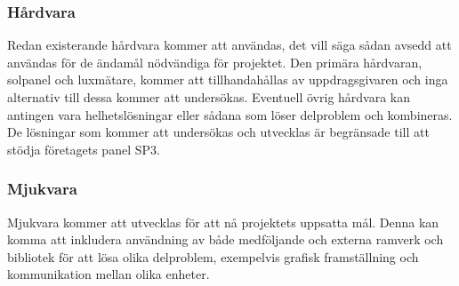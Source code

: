         \subsubsection{Hårdvara} %
        \label{ssub:h_rdvara}
            Redan existerande hårdvara kommer att användas, det vill säga sådan avsedd att användas för de ändamål nödvändiga för projektet. 
            Den primära hårdvaran, solpanel och luxmätare, kommer att tillhandahållas av uppdragsgivaren och inga alternativ till dessa kommer att undersökas. 
            Eventuell övrig hårdvara kan antingen vara helhetslösningar eller sådana som löser delproblem och kombineras. 
            De lösningar som kommer att undersökas och utvecklas är begränsade till att stödja företagets panel SP3.

        \subsubsection{Mjukvara} %
        \label{ssub:mjukvara}
            Mjukvara kommer att utvecklas för att nå projektets uppsatta mål. 
            Denna kan komma att inkludera användning av både medföljande och externa ramverk och bibliotek för att lösa olika delproblem, exempelvis grafisk framställning och kommunikation mellan olika enheter.


